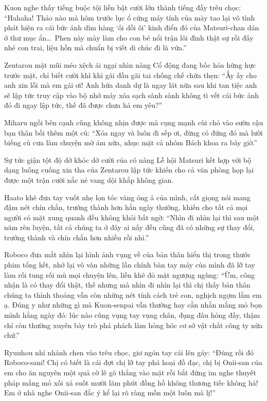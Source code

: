 \documentclass[../main.tex]{subfiles}
\begin{document}
Kuon nghe thấy tiếng buộc tội liền bật cười lớn thành tiếng đầy trêu chọc: ``Hahaha! Thảo nào mà hôm trước lục ổ cứng máy tính của mày tao lại vô tình phát hiện ra cái bức ảnh dìm hàng `ối dồi ôi' kinh điển đó của Matsuri-chan dán ở thư mục ẩn\dots\ Phen này mày làm cho con bé nổi trận lôi đình thật sự rồi đấy nhé con trai, liệu hồn mà chuẩn bị viết di chúc đi là vừa.''

Zentarou mặt mũi méo xệch ái ngại nhìn nàng Cổ động đang bốc hỏa hừng hực trước mặt, chỉ biết cười khì khì gãi đầu gãi tai chống chế chữa thẹn: ``Ấy ấy cho anh xin lỗi mà em gái ơi! Anh hứa danh dự là ngay lát nữa sau khi tan tiệc anh sẽ lập tức truy cập vào bộ nhớ máy xóa sạch sành sành không tì vết cái bức ảnh đó đi ngay lập tức, thế đã được chưa hả em yêu?''

Miharu ngồi bên cạnh cũng không nhịn được mà cụng mạnh cùi chỏ vào sườn cậu bạn thân bồi thêm một cú: ``Xóa ngay và luôn đi sếp ơi, đừng có đứng đó mà lười biếng cù cưa làm chuyện mờ ám nữa, nhục mặt cả nhóm Bách khoa ra bây giờ.''

Sự tức giận tột độ dở khóc dở cười của cô nàng Lễ hội Matsuri kết hợp với bộ dạng luống cuống xin tha của Zentarou lập tức khiến cho cả văn phòng họp lại được một trận cười nắc nẻ vang dội khắp không gian.

Haato khẽ đưa tay vuốt nhẹ lọn tóc vàng óng ả của mình, cất giọng nói mang đậm nét chín chắn, trưởng thành hơn hẳn ngày thường, khiến cho tất cả mọi người có mặt xung quanh đều không khỏi bất ngờ: ``Nhìn đi nhìn lại thì sau một năm rèn luyện, tất cả chúng ta ở đây ai nấy đều cũng đã có những sự thay đổi, trưởng thành và chín chắn hơn nhiều rồi nhỉ.''

Roboco đưa mắt nhìn lại hình ảnh vụng về của bản thân hiển thị trong thước phim tổng kết, nhớ lại vô vàn những lần chính bàn tay máy của mình đã lỡ tay làm rối tung rối mù mọi chuyện lên, liền khẽ đỏ mặt ngượng ngùng: ``Ừm, công nhận là có thay đổi thật, thế nhưng mà nhìn đi nhìn lại thì chị thấy bản thân chúng ta thỉnh thoảng vẫn còn những nét tính cách trẻ con, nghịch ngợm lắm em ạ. Đúng y như những gì mà Kuon-senpai vẫn thường hay cằn nhằn mắng mỏ bọn mình hằng ngày đó: lúc nào cũng vụng tay vụng chân, đụng đâu hỏng đấy, thậm chí còn thường xuyên bày trò phá phách làm hỏng hóc cơ sở vật chất công ty nữa chứ.''

Ryuuhou nhí nhảnh chen vào trêu chọc, giơ ngón tay cái lên gáy: ``Đúng rồi đó Roboco-sani! Chị có biết là cái đợt chị lỡ tay phá hoại đồ đạc, chị bị Onii-san của em cho ăn nguyên một quả cờ lê gõ thẳng vào mặt rồi bắt đứng im nghe thuyết pháp mắng mỏ xối xả suốt mười lăm phút đồng hồ không thương tiếc không hả! Em ở nhà nghe Onii-san đắc ý kể lại rõ ràng mồn một luôn mà lị!''
\end{document}
